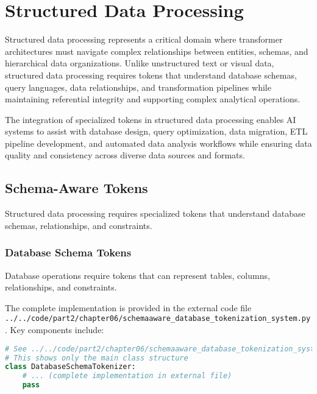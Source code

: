 
\section{Structured Data Processing}

Structured data processing represents a critical domain where transformer architectures must navigate complex relationships between entities, schemas, and hierarchical data organizations. Unlike unstructured text or visual data, structured data processing requires tokens that understand database schemas, query languages, data relationships, and transformation pipelines while maintaining referential integrity and supporting complex analytical operations.

The integration of specialized tokens in structured data processing enables AI systems to assist with database design, query optimization, data migration, ETL pipeline development, and automated data analysis workflows while ensuring data quality and consistency across diverse data sources and formats.

\subsection{Schema-Aware Tokens}

Structured data processing requires specialized tokens that understand database schemas, relationships, and constraints.

\subsubsection{Database Schema Tokens}

Database operations require tokens that can represent tables, columns, relationships, and constraints.

The complete implementation is provided in the external code file \texttt{../../code/part2/chapter06/schemaaware\_database\_tokenization\_system.py}. Key components include:

\begin{lstlisting}[language=Python, caption=Core structure (see external file for complete implementation)]
# See ../../code/part2/chapter06/schemaaware_database_tokenization_system.py for the complete implementation
# This shows only the main class structure
class DatabaseSchemaTokenizer:
    # ... (complete implementation in external file)
    pass
\end{lstlisting}
